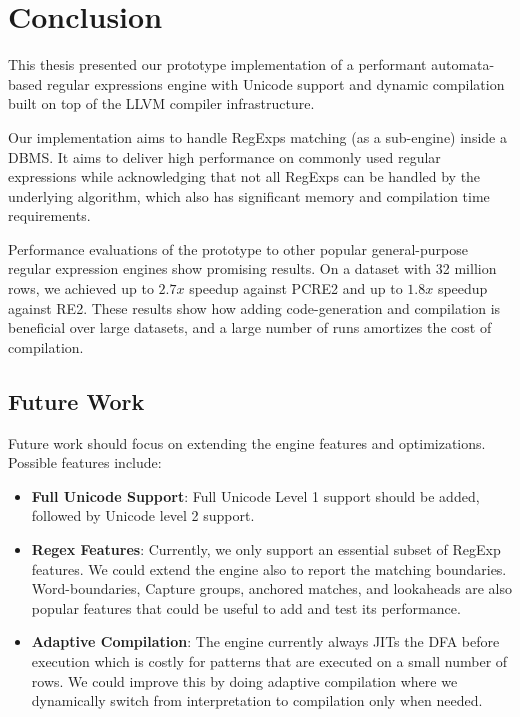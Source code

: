 \chapter{Conclusion}\label{chapter:conclusion}
This thesis presented our prototype implementation of a performant automata-based regular expressions engine with Unicode support and dynamic compilation built on top of the LLVM compiler infrastructure.

Our implementation aims to handle RegExps matching (as a sub-engine) inside a DBMS. It aims to deliver high performance on commonly used regular expressions while acknowledging that not all RegExps can be handled by the underlying algorithm, which also has significant memory and compilation time requirements.

Performance evaluations of the prototype to other popular general-purpose regular expression engines show promising results. On a dataset with 32 million rows, we achieved up to $2.7x$ speedup against PCRE2 and up to $1.8x$ speedup against RE2. These results show how adding code-generation and compilation is beneficial over large datasets, and a large number of runs amortizes the cost of compilation.

\section{Future Work}\label{futurework}

Future work should focus on extending the engine features and optimizations. Possible features include:
\begin{itemize}
    \item \textbf{Full Unicode Support}: Full Unicode Level 1 support should be added, followed by Unicode level 2 support.
    \item \textbf{Regex Features}: Currently, we only support an essential subset of RegExp features. We could extend the engine also to report the matching boundaries. Word-boundaries, Capture groups, anchored matches, and lookaheads are also popular features that could be useful to add and test its performance.  
    \item \textbf{Adaptive Compilation}: The engine currently always JITs the DFA before execution which is costly for patterns that are executed on a small number of rows. We could improve this by doing adaptive compilation where we dynamically switch from interpretation to compilation only when needed.
\end{itemize}

